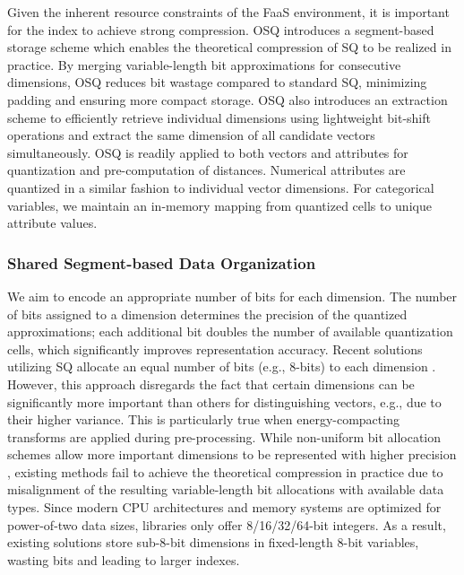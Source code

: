 Given the inherent resource constraints of the FaaS environment, it is important for the index to achieve strong compression. OSQ introduces a segment-based storage scheme which enables the theoretical compression of SQ to be realized in practice. 
By merging variable-length bit approximations for consecutive dimensions, OSQ reduces bit wastage compared to standard SQ, minimizing padding and ensuring more compact storage. 
OSQ also introduces an extraction scheme to efficiently retrieve individual dimensions using lightweight bit-shift operations and extract the same dimension of all candidate vectors simultaneously.
OSQ is readily applied to both vectors and attributes for quantization and pre-computation of distances. Numerical attributes are quantized in a similar fashion to individual vector dimensions. For categorical variables, we maintain an in-memory mapping from quantized cells to unique attribute values.

\subsubsection{Shared Segment-based Data Organization}
We aim to encode an appropriate number of bits for each dimension. The number of bits assigned to a dimension determines the precision of the quantized approximations; each additional bit doubles the number of available quantization cells, which significantly improves representation accuracy. Recent solutions utilizing SQ allocate an equal number of bits (e.g., 8-bits) to each dimension \cite{douze2024faisslibraryivfsq8, ZillizSQ}. 
However, this approach disregards the fact that certain dimensions can be significantly more important than others for distinguishing vectors, e.g., due to their higher variance. 
This is particularly true when energy-compacting transforms are applied during pre-processing.
While non-uniform bit allocation schemes allow more important dimensions to be represented with higher precision \cite{Ferhatosmanoglu2000VAPlus}, existing methods fail to achieve the theoretical compression in practice due to misalignment of the resulting variable-length bit allocations with available data types. 
Since modern CPU architectures and memory systems are optimized for power-of-two data sizes, libraries only offer 8/16/32/64-bit integers. 
As a result, existing solutions store sub-8-bit dimensions in fixed-length 8-bit variables, wasting bits and leading to larger indexes.

